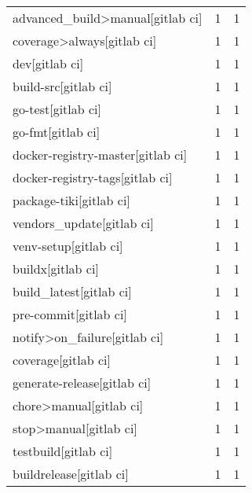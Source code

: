 \begin{tabular}{lrr}
advanced\_build>manual[gitlab ci]           &                   1 &             1 \\
coverage>always[gitlab ci]                 &                   1 &             1 \\
dev[gitlab ci]                             &                   1 &             1 \\
build-src[gitlab ci]                       &                   1 &             1 \\
go-test[gitlab ci]                         &                   1 &             1 \\
go-fmt[gitlab ci]                          &                   1 &             1 \\
docker-registry-master[gitlab ci]          &                   1 &             1 \\
docker-registry-tags[gitlab ci]            &                   1 &             1 \\
package-tiki[gitlab ci]                    &                   1 &             1 \\
vendors\_update[gitlab ci]                  &                   1 &             1 \\
venv-setup[gitlab ci]                      &                   1 &             1 \\
buildx[gitlab ci]                          &                   1 &             1 \\
build\_latest[gitlab ci]                    &                   1 &             1 \\
pre-commit[gitlab ci]                      &                   1 &             1 \\
notify>on\_failure[gitlab ci]               &                   1 &             1 \\
coverage[gitlab ci]                        &                   1 &             1 \\
generate-release[gitlab ci]                &                   1 &             1 \\
chore>manual[gitlab ci]                    &                   1 &             1 \\
stop>manual[gitlab ci]                     &                   1 &             1 \\
testbuild[gitlab ci]                       &                   1 &             1 \\
buildrelease[gitlab ci]                    &                   1 &             1 \\

\end{tabular}
